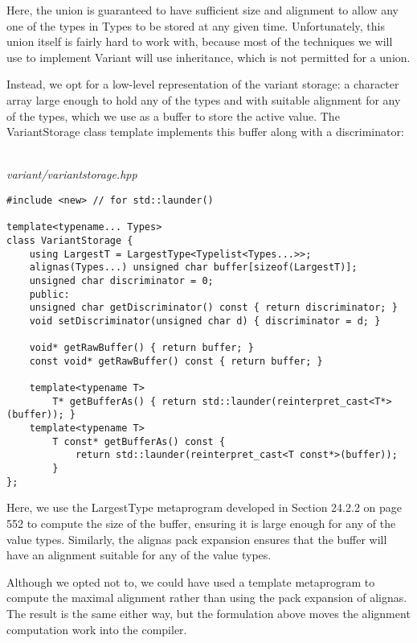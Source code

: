 Here, the union is guaranteed to have sufficient size and alignment to allow any one of the types in Types to be stored at any given time. Unfortunately, this union itself is fairly hard to work with, because most of the techniques we will use to implement Variant will use inheritance, which is not permitted for a union.

Instead, we opt for a low-level representation of the variant storage: a character array large enough to hold any of the types and with suitable alignment for any of the types, which we use as a buffer to store the active value. The VariantStorage class template implements this buffer along with a discriminator:

\hspace*{\fill} \\ %
\noindent
\textit{variant/variantstorage.hpp}
\begin{lstlisting}[style=styleCXX]
#include <new> // for std::launder()

template<typename... Types>
class VariantStorage {
	using LargestT = LargestType<Typelist<Types...>>;
	alignas(Types...) unsigned char buffer[sizeof(LargestT)];
	unsigned char discriminator = 0;
	public:
	unsigned char getDiscriminator() const { return discriminator; }
	void setDiscriminator(unsigned char d) { discriminator = d; }
	
	void* getRawBuffer() { return buffer; }
	const void* getRawBuffer() const { return buffer; }
	
	template<typename T>
		T* getBufferAs() { return std::launder(reinterpret_cast<T*>(buffer)); }
	template<typename T>
		T const* getBufferAs() const {
			return std::launder(reinterpret_cast<T const*>(buffer));
		}
};
\end{lstlisting}

Here, we use the LargestType metaprogram developed in Section 24.2.2 on page 552 to compute the size of the buffer, ensuring it is large enough for any of the value types. Similarly, the alignas pack expansion ensures that the buffer will have an alignment suitable for any of the value types.

\begin{tcolorbox}[colback=webgreen!5!white,colframe=webgreen!75!black]
\hspace*{0.75cm}Although we opted not to, we could have used a template metaprogram to compute the maximal alignment rather than using the pack expansion of alignas. The result is the same either way, but the formulation above moves the alignment computation work into the compiler.
\end{tcolorbox}

